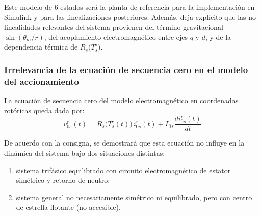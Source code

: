 \documentclass[12pt, a4paper,journal, onecolumn, compsoc]{IEEEtran}
\begin{document}
    Este modelo de 6 estados será la planta de referencia para la implementación en Simulink y para las linealizaciones posteriores. Además, deja explícito que las no linealidades relevantes del sistema provienen del término gravitacional \(\sin(\theta_m/r)\), del acoplamiento electromagnético entre ejes \(q\) y \(d\), y de la dependencia térmica de \(R_s\big(T_s^\circ\big)\).


    \subsubsection{Irrelevancia de la ecuación de secuencia cero en el modelo del accionamiento}

    La ecuación de secuencia cero del modelo electromagnético en coordenadas rotóricas queda dada por:
    \begin{equation}
        v_{0s}^r(t)=R_s\!\big(T_s^\circ(t)\big)\,i_{0s}^r(t)+L_{ls}\frac{d i_{0s}^r(t)}{dt}
        \label{eq:v0s_rotor_final}
    \end{equation}

    De acuerdo con la consigna, se demostrará que esta ecuación no influye en la dinámica del sistema bajo dos situaciones distintas:

    \begin{enumerate}
        \item sistema trifásico equilibrado con circuito electromagnético de estator simétrico y retorno de neutro;
        \item sistema general no necesariamente simétrico ni equilibrado, pero con centro de estrella flotante (no accesible).
    \end{enumerate}
\end{document}
